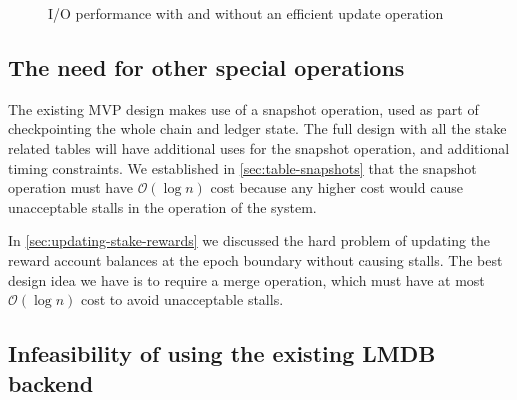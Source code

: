 \documentclass[11pt,a4paper]{article}
\begin{document}
\begin{figure}
\centering
{}
\caption{I/O performance with and without an efficient {\sc update} operation}
\label{fig:io-perf-update-op}
\end{figure}

\subsection{The need for other special operations}

The existing MVP design makes use of a {\sc snapshot} operation, used as part
of checkpointing the whole chain and ledger state. The full design with all the
stake related tables will have additional uses for the {\sc snapshot} operation,
and additional timing constraints. We established in \cref{sec:table-snapshots}
that the {\sc snapshot} operation must have $\mathcal{O}(\log n)$ cost because
any higher cost would cause unacceptable stalls in the operation of the system.

In \cref{sec:updating-stake-rewards} we discussed the hard problem of updating
the reward account balances at the epoch boundary without causing stalls. The
best design idea we have is to require a {\sc merge} operation, which must have
at most $\mathcal{O}(\log n)$ cost to avoid unacceptable stalls.

\subsection{Infeasibility of using the existing LMDB backend}
\label{sec:performance-limits-of-the-lmdb-backend}
\end{document}
